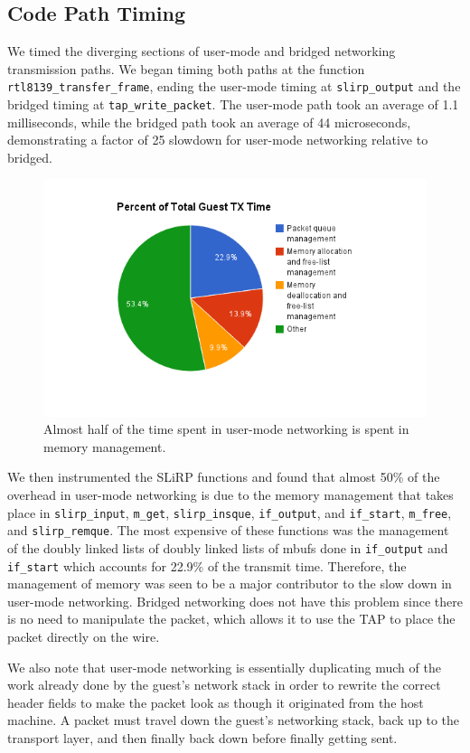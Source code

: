 \subsection{Code Path Timing}
\label{codePathTiming}
We timed the diverging sections of user-mode and bridged networking transmission paths. 
We began timing both paths at the function \texttt{rtl8139\_transfer\_frame}, ending the user-mode timing at \texttt{slirp\_output} and the bridged timing at \texttt{tap\_write\_packet}. 
The user-mode path took an average of 1.1 milliseconds, while the bridged path took an average of 44 microseconds, demonstrating a factor of 25 slowdown for user-mode networking relative to bridged.

\begin{figure}[htbp]
	\centering
		\includegraphics[scale=0.5]{usermodeTXtime}
	\caption{Almost half of the time spent in user-mode networking is spent in memory management.}
	\label{fig:usermodeTXtime}
\end{figure}

We then instrumented the SLiRP functions and found that almost 50\% of the overhead in user-mode networking is due to the memory management that takes place in \texttt{slirp\_input},
\texttt{m\_get}, \texttt{slirp\_insque}, \texttt{if\_output}, and \texttt{if\_start}, \texttt{m\_free}, and \texttt{slirp\_remque}.
The most expensive of these functions was the management of the doubly linked lists of doubly linked lists of mbufs done in \texttt{if\_output} and \texttt{if\_start} which accounts for 22.9\%
of the transmit time.
Therefore, the management of memory was seen to be a major contributor to the slow down in user-mode networking.
Bridged networking does not have this problem since there is no need to manipulate the packet, which allows it to use the TAP to place the packet directly on the wire.

We also note that user-mode networking is essentially duplicating much of the work already done by the guest's network stack in order to rewrite the correct header fields to make the packet
look as though it originated from the host machine.
A packet must travel down the guest's networking stack, back up to the transport layer, and then finally back down before finally getting sent.


